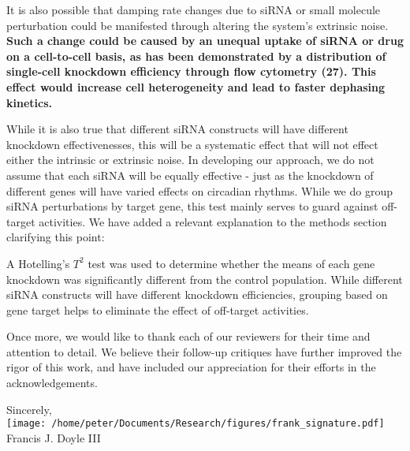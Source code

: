 \documentclass[11pt, letterpaper]{article}
\newenvironment{manuscript}[1]{\begin{center}\begin{tcolorbox}[colback=green!5!white,colframe=green!75!black,width=\textwidth,title={#1},breakable,fonttitle=\bfseries]}{\end{tcolorbox}\end{center}}
\begin{document}
\begin{manuscript}{Pages 6-7}
It is also possible that damping rate changes due to siRNA or small molecule perturbation could be manifested through altering the system’s extrinsic noise. 
{\bfseries Such a change could be caused by an unequal uptake of siRNA or drug on a cell-to-cell basis, as has been demonstrated by a distribution of single-cell knockdown efficiency through flow cytometry (27). 
This effect would increase cell heterogeneity and lead to faster dephasing kinetics.}
\end{manuscript}

While it is also true that different siRNA constructs will have different knockdown effectivenesses, this will be a systematic effect that will not effect either the intrinsic or extrinsic noise.
In developing our approach, we do not assume that each siRNA will be equally effective - just as the knockdown of different genes will have varied effects on circadian rhythms.
While we do group siRNA perturbations by target gene, this test mainly serves to guard against off-target activities.
We have added a relevant explanation to the methods section clarifying this point:

\begin{manuscript}{Page 10}
A Hotelling's $T^2$ test was used to determine whether the means of each gene knockdown was significantly different from the control population.
While different siRNA constructs will have different knockdown efficiencies, grouping based on gene target helps to eliminate the effect of off-target activities. 
\end{manuscript}


Once more, we would like to thank each of our reviewers for their time and attention to detail.
We believe their follow-up critiques have further improved the rigor of this work, and have included our appreciation for their efforts in the acknowledgements.

\vspace{4ex}
\begin{flushright}
  Sincerely,\\[2ex]

  \texttt{[image: /home/peter/Documents/Research/figures/frank\_signature.pdf]}\\[1ex]
Francis J. Doyle III
\end{flushright}
\end{document}
